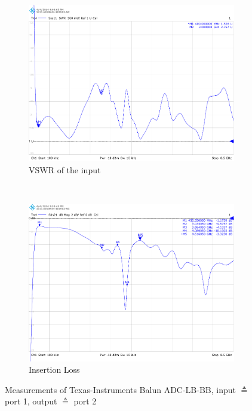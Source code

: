 \begin{figure}[p]
  \centering
  \begin{subfigure}{0.45\textwidth}
    \centering
    \includegraphics[width=\textwidth]{figures/network_analyzer/TI_ADC-LB-BB_Balun_swr_id1}
    \caption{\gls{VSWR} of the input}
  \end{subfigure}
  ~
  \begin{subfigure}{0.45\textwidth}
    \centering
    \includegraphics[width=\textwidth]{figures/network_analyzer/TI_ADC-LB-BB_Balun_insertion_loss_id1}
    \caption{Insertion Loss}
  \end{subfigure}
  \caption{Measurements of Texas-Instruments Balun ADC-LB-BB,
    input $\triangleq$ port 1, output $\triangleq$ port 2}
  \label{fig:comp_lbbb}
\end{figure}

